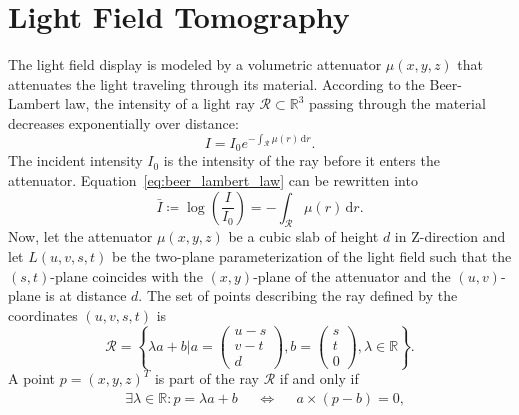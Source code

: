 \section{Light Field Tomography}

The light field display is modeled by a volumetric attenuator $\mu(x, y, z)$ that attenuates the light traveling through its material.
According to the Beer-Lambert law, the intensity of a light ray $\mathcal{R} \subset \mathbb{R}^3$ passing through the material decreases exponentially over distance:
\begin{equation}\label{eq:beer_lambert_law}
	I = I_0 e^{-\int_\mathcal{R} \mu(r) \, \mathrm{d}r }.
\end{equation}
The incident intensity $I_0$ is the intensity of the ray before it enters the attenuator.
Equation~\ref{eq:beer_lambert_law} can be rewritten into 
\begin{equation}\label{eq:log_beer_lambert_law}
	\bar{I} \coloneqq \log \left( \frac{I}{I_0} \right) = -\int_\mathcal{R} \mu(r) \, \mathrm{d}r.
\end{equation} 
Now, let the attenuator $\mu(x, y, z)$ be a cubic slab of height $d$ in Z-direction and let $L(u, v, s, t)$ be the two-plane parameterization of the light field such that the $(s, t)$-plane coincides with the $(x, y)$-plane of the attenuator and the $(u, v)$-plane is at distance $d$.
The set of points describing the ray defined by the coordinates $(u, v, s, t)$ is
\begin{equation}
	\mathcal{R} = \left\{ \lambda a + b 
	\mathrel{\bigg|} a = 
	\begin{pmatrix}
		u - s \\ 
		v - t \\ 
		d
	\end{pmatrix}, 
	b = 
	\begin{pmatrix}
		s \\ 
		t \\ 
		0
	\end{pmatrix},
	\lambda \in \mathbb{R} 
	\right\}.
\end{equation}
A point $p = (x, y, z)^T$ is part of the ray $\mathcal{R}$ if and only if
\begin{align}
	& \exists \lambda \in \mathbb{R} : p = \lambda a + b & & \iff & & a \times (p - b) = 0, 
\end{align} 
